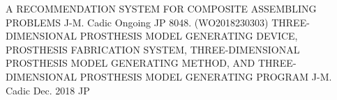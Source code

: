 \begin{cvhonors}
\cvpublication
    {A RECOMMENDATION SYSTEM FOR COMPOSITE ASSEMBLING PROBLEMS}
    {J-M. Cadic}
    {Ongoing}
    {JP}
\cvpublication
    {8048. (WO2018230303) THREE-DIMENSIONAL PROSTHESIS MODEL GENERATING DEVICE, PROSTHESIS FABRICATION SYSTEM, THREE-DIMENSIONAL PROSTHESIS MODEL GENERATING METHOD, AND THREE-DIMENSIONAL PROSTHESIS MODEL GENERATING PROGRAM}
    {J-M. Cadic}
    {Dec. 2018}
    {JP}
\end{cvhonors}
